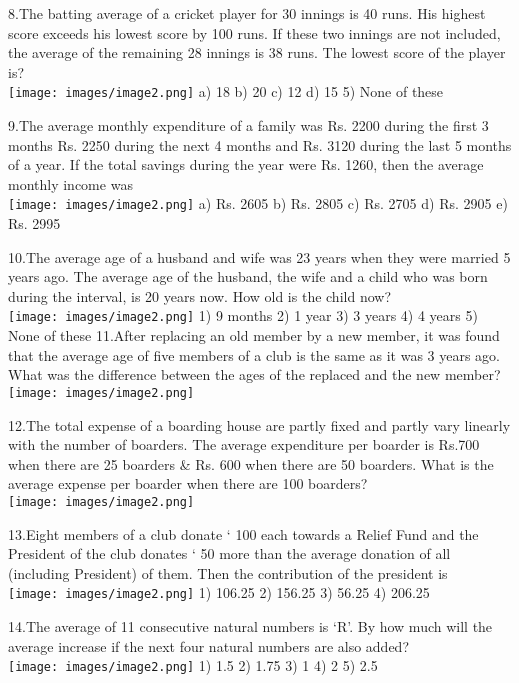 \documentclass[
]{article}
\begin{document}
8.The batting average of a cricket player for 30 innings is 40 runs. His highest score exceeds his lowest score by 100 runs. If these two innings are not included, the average of the remaining 28 innings is 38 runs. The lowest score of the player is?   \\
\texttt{[image: images/image2.png]}  a) 18 	b) 20 	c) 12 	d) 15 	5) None of these

9.The average monthly expenditure of a family was Rs. 2200 during the first 3 months Rs. 2250 during the next 4 months and Rs. 3120 during the last 5 months of a year. If the total savings during the year were Rs. 1260, then the average monthly income was   \\
\texttt{[image: images/image2.png]}  a) Rs. 2605 	b) Rs. 2805 	c) Rs. 2705 	d) Rs. 2905 	e) Rs. 2995

10.The average age of a husband and wife was 23 years when they were married 5 years ago. The average age of the husband, the wife and a child who was born during the interval, is 20 years now. How old is the child now?   \\
\texttt{[image: images/image2.png]}  1) 9 months 	2) 1 year 	3) 3 years 	4) 4 years 	5) None of these
\newpage
11.After replacing an old member by a new member, it was found that the average age of five members of a club is the same as it was 3 years ago. What was the difference between the ages of the replaced and the new member?  \\
\texttt{[image: images/image2.png]}  

12.The total expense of a boarding house are partly fixed and partly vary linearly with the number of boarders. The average expenditure per boarder is Rs.700 when there are 25 boarders \& Rs. 600 when there are 50 boarders. What is the average expense per boarder when there are 100 boarders? \\
\texttt{[image: images/image2.png]}  

13.Eight members of a club donate ` 100 each towards a Relief Fund and the President of the club donates ` 50 more than the average donation of all (including President) of them. Then the contribution of the president is   \\
\texttt{[image: images/image2.png]}  1) 106.25 	2) 156.25 	3) 56.25 	4) 206.25

14.The average of 11 consecutive natural numbers is ‘R’. By how much will the average increase if the next four natural numbers are also added?   \\
\texttt{[image: images/image2.png]}  	1) 1.5 	2) 1.75 	3) 1 	4) 2 	5) 2.5
\end{document}
